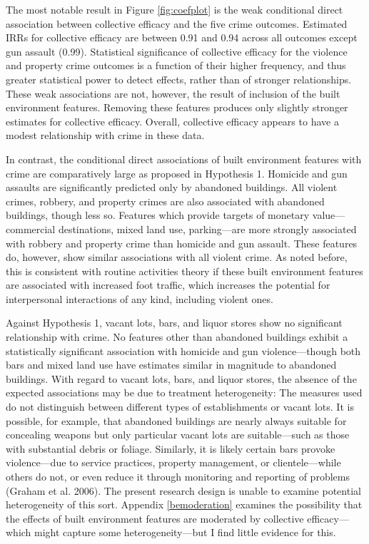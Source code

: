 \documentclass [11pt, proquest] {uwthesis}[2015/03/03]
\begin{document}
The most notable result in Figure \ref{fig:coefplot} is the weak conditional direct association between collective efficacy and the five crime outcomes. Estimated IRRs for collective efficacy are between 0.91 and 0.94 across all outcomes except gun assault (0.99). Statistical significance of collective efficacy for the violence and property crime outcomes is a function of their higher frequency, and thus greater statistical power to detect effects, rather than of stronger relationships. These weak associations are not, however, the result of inclusion of the built environment features. Removing these features produces only slightly stronger estimates for collective efficacy. Overall, collective efficacy appears to have a modest relationship with crime in these data.

In contrast, the conditional direct associations of built environment features with crime are comparatively large as proposed in Hypothesis 1. Homicide and gun assaults are significantly predicted only by abandoned buildings. All violent crimes, robbery, and property crimes are also associated with abandoned buildings, though less so. Features which provide targets of monetary value---commercial destinations, mixed land use, parking---are more strongly associated with robbery and property crime than homicide and gun assault. These features do, however, show similar associations with all violent crime. As noted before, this is consistent with routine activities theory if these built environment features are associated with increased foot traffic, which increases the potential for interpersonal interactions of any kind, including violent ones.

Against Hypothesis 1, vacant lots, bars, and liquor stores show no significant relationship with crime. No features other than abandoned buildings exhibit a statistically significant association with homicide and gun violence---though both bars and mixed land use have estimates similar in magnitude to abandoned buildings. With regard to vacant lots, bars, and liquor stores, the absence of the expected associations may be due to treatment heterogeneity: The measures used do not distinguish between different types of establishments or vacant lots. It is possible, for example, that abandoned buildings are nearly always suitable for concealing weapons but only particular vacant lots are suitable---such as those with substantial debris or foliage. Similarly, it is likely certain bars provoke violence---due to service practices, property management, or clientele---while others do not, or even reduce it through monitoring and reporting of problems (Graham et al. 2006). The present research design is unable to examine potential heterogeneity of this sort. Appendix \ref{bemoderation} examines the possibility that the effects of built environment features are moderated by collective efficacy---which might capture some heterogeneity---but I find little evidence for this.
\end{document}
